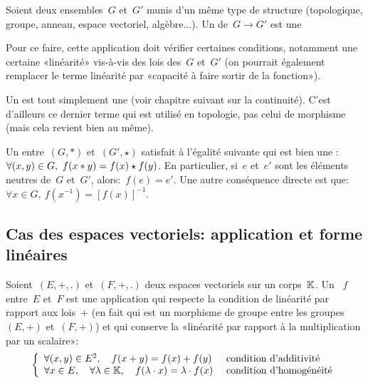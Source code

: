 \medskip
Soient deux ensembles~$G$ et~$G'$ munis d'un même type de structure (topologique, groupe,
anneau, espace vectoriel, algèbre...).
Un  de~$G \to G'$ est une 

Pour ce faire, cette application doit vérifier certaines conditions, notamment une certaine «linéarité» vis-à-vis des lois des~$G$ et~$G'$ (on pourrait également remplacer le terme linéarité par «capacité à faire sortir de la fonction»).

\medskip
Un  est tout simplement une  (voir chapitre suivant sur la continuité).
C'est d'ailleurs ce dernier terme qui est utilisé en topologie, pas celui de morphisme (mais cela revient bien au même).

\medskip
Un  entre~$(G,*)$ et~$(G',\star)$ satisfait à l'égalité suivante qui est bien une :
$\colorred
\forall (x,y)\in G,\ f(x*y)=f(x)\star f(y)
$.
En particulier, si~$e$ et~$e'$ sont les éléments neutres de~$G$ et~$G'$, alors:~$f(e)=e'$.
Une autre conséquence directe est que:~$\forall x \in G,\ f(x^{-1})=[f(x)]^{-1}$.

\medskip\ifVersionDuDocEstVincent\else\newpage\fi
\subsection{Cas des espaces vectoriels: application et forme linéaires}

\begin{definition}
Soient~$(E,+,.)$ et~$(F,+,.)$ deux espaces vectoriels sur un corps~$\mathbb K$.
Un ~$f$ entre~$E$ et~$F$ est une application qui respecte la condition de linéarité par rapport aux lois~$+$ (en fait qui est un morphisme de groupe entre les groupes~$(E,+)$ et~$(F,+)$) et qui conserve la «linéarité par rapport à la multiplication par un scalaire»:
\begin{equation}\left\{
\begin{array}{ll}
\forall (x,y)\in E^2, \quad f(x+ y)=f(x)+ f(y) &\text{ condition d'additivité}\\
\forall x\in E,\quad \forall \lambda\in\mathbb K,\quad f(\lambda\cdot x)=\lambda\cdot f(x) &\text{ condition d'homogénéité}
\end{array}
\right.\end{equation}
\end{definition}

